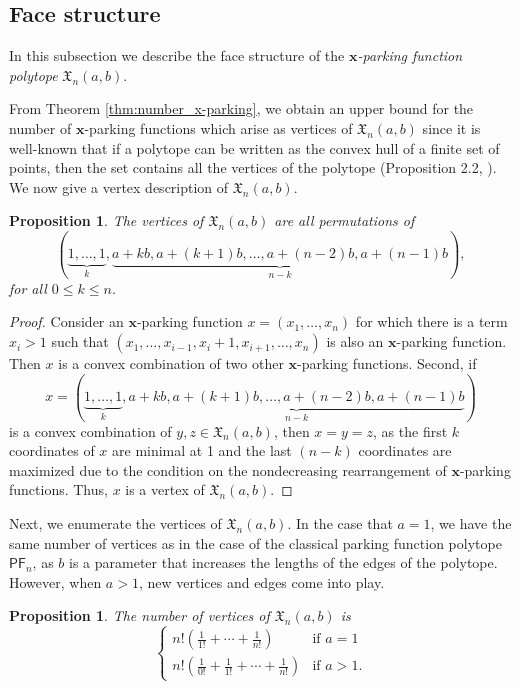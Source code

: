 \documentclass[11pt]{amsart}
\newtheorem{proposition}[theorem]{Proposition}
\theoremstyle{definition}
\newcommand{\0}{\emptyset}
\newcommand{\bx}{\mathbf{x}}
\newcommand{\Xn}{\mathfrak{X}_{n}(a,b)}
\newcommand{\PF}{\mathsf{PF}}
\begin{document}

\subsection{Face structure}

In this subsection we describe the face structure of the \emph{$\bx$-parking function polytope} $\Xn$.

From Theorem \ref{thm:number_x-parking}, we obtain an upper bound for the number of $\bx$-parking functions which arise as vertices of $\Xn$ since it is well-known that if a polytope can be written as the convex hull of a finite set of points, then the set contains all the vertices of the polytope (Proposition 2.2, \cite{Ziegler}). 
We now give a vertex description of $\Xn$.

\begin{proposition}\label{prop:abn_vertex}
The vertices of $\Xn$ are all permutations of 
\[ (\underbrace{1, \ldots, 1}_k, \underbrace{a+kb, a+(k+1)b, \ldots, a+(n-2)b, a+(n-1)b}_{n-k}),\] for all $0 \leq k \leq n$.
\end{proposition}

\begin{proof}
Consider an $\bx$-parking function $x = (x_1, \ldots, x_n)$ for which there is a term $x_i > 1$ such that $(x_1, \ldots, x_{i-1}, x_{i} + 1, x_{i+1}, \ldots, x_n)$ is also an $\bx$-parking function. 
Then $x$ is a convex combination of two other $\bx$-parking functions. 
Second, if \[ x= (\underbrace{1, \ldots, 1}_k, \underbrace{a+kb, a+(k+1)b, \ldots, a+(n-2)b, a+(n-1)b}_{n-k})\] is a convex combination of $y,z \in \Xn$, then $x=y=z$, as the first $k$ coordinates of $x$ are minimal at 1 and the last $(n-k)$ coordinates are maximized due to the condition on the nondecreasing rearrangement of $\bx$-parking functions.
Thus, $x$ is a vertex of $\Xn$.
\end{proof}

Next, we enumerate the vertices of $\Xn$. 
In the case that $a=1$, we have the same number of vertices as in the case of the classical parking function polytope $\PF_n$, as $b$ is a parameter that increases the lengths of the edges of the polytope.
However, when $a >1$, new vertices and edges come into play.

\begin{proposition}\label{thm:num_vertices}
The number of vertices of $\Xn$ is 
\[ \begin{cases} 
n!\left( \frac{1}{1!} + \cdots + \frac{1}{n!} \right) & \text{if } a = 1\\
n!\left( \frac{1}{0!} + \frac{1}{1!} + \cdots + \frac{1}{n!} \right) & \text{if } a > 1.
\end{cases}\]
\end{proposition}
\end{document}

